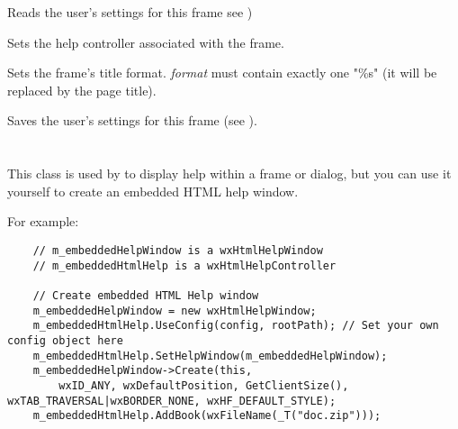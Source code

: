 
Reads the user's settings for this frame see )

\label{wxhtmlhelpframesetcontroller}


Sets the help controller associated with the frame.

\label{wxhtmlhelpframesettitleformat}


Sets the frame's title format. {\it format} must contain exactly one "\%s"
(it will be replaced by the page title).

\label{wxhtmlhelpframewritecustomization}


Saves the user's settings for this frame (see ).

\section{}\label{wxhtmlhelpwindow}

This class is used by  
to display help within a frame or dialog, but you can use it yourself to create an embedded HTML help window.

For example:

\begin{verbatim}
    // m_embeddedHelpWindow is a wxHtmlHelpWindow
    // m_embeddedHtmlHelp is a wxHtmlHelpController

    // Create embedded HTML Help window
    m_embeddedHelpWindow = new wxHtmlHelpWindow;
    m_embeddedHtmlHelp.UseConfig(config, rootPath); // Set your own config object here
    m_embeddedHtmlHelp.SetHelpWindow(m_embeddedHelpWindow);    
    m_embeddedHelpWindow->Create(this,
        wxID_ANY, wxDefaultPosition, GetClientSize(), wxTAB_TRAVERSAL|wxBORDER_NONE, wxHF_DEFAULT_STYLE);        
    m_embeddedHtmlHelp.AddBook(wxFileName(_T("doc.zip")));
\end{verbatim}

